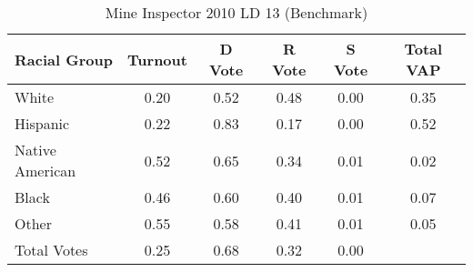 \begin{table}[htb]
\begin{center}
\caption{Mine Inspector 2010 LD 13 (Benchmark)}
\label{smine_vap_ld_13_benchmark}
\begin{tabular}{lccccc}
  \hline
Racial Group & Turnout & D Vote & R Vote & S Vote & Total VAP \\ 
  \hline
White & 0.20 & 0.52 & 0.48 & 0.00 & 0.35 \\ 
  Hispanic & 0.22 & 0.83 & 0.17 & 0.00 & 0.52 \\ 
  Native American & 0.52 & 0.65 & 0.34 & 0.01 & 0.02 \\ 
  Black & 0.46 & 0.60 & 0.40 & 0.01 & 0.07 \\ 
  Other & 0.55 & 0.58 & 0.41 & 0.01 & 0.05 \\ 
  Total Votes & 0.25 & 0.68 & 0.32 & 0.00 &  \\ 
   \hline
\end{tabular}
\end{center}
\end{table}
